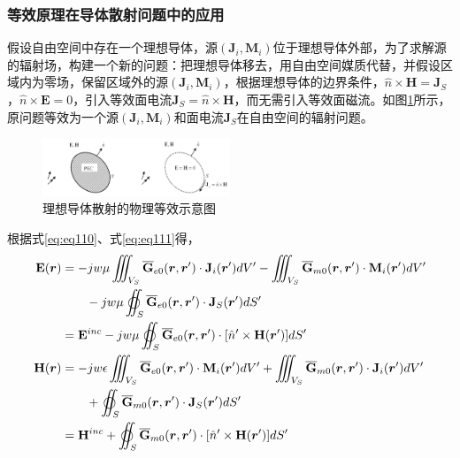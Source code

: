\documentclass{article}
\numberwithin{equation}{section}
\renewcommand{\vec}[1]{\boldsymbol{#1}}
\begin{document}
\subsubsection{等效原理在导体散射问题中的应用}
假设自由空间中存在一个理想导体，源$(\mathbf{J}_i,\mathbf{M}_i)$位于理想导体外部，为了求解源的辐射场，构建一个新的问题：把理想导体移去，用自由空间媒质代替，并假设区域内为零场，保留区域外的源$(\mathbf{J}_i,\mathbf{M}_i)$，根据理想导体的边界条件，$\hat{n}\times\mathbf{H}=\mathbf{J}_S$，$\hat{n}\times\mathbf{E}=0$，引入等效面电流$\mathbf{J}_S=\hat{n}\times\mathbf{H}$，而无需引入等效面磁流。如图\ref{fig:fig17}所示，原问题等效为一个源$(\mathbf{J}_i,\mathbf{M}_i)$和面电流$\mathbf{J}_S$在自由空间的辐射问题。
\begin{figure}[ht]
    \centering
    \includegraphics[width=0.5\textwidth]{理想导体散射的物理等效示意图.PNG}
    \caption{理想导体散射的物理等效示意图}
    \label{fig:fig17}
\end{figure}
\par
根据式\ref{eq:eq110}、式\ref{eq:eq111}得，
\begin{align}
    \label{eq:eq220}
    \mathbf{E}(\vec{r})&=-jw\mu\iiint_{V_S}\overline{\mathbf{G}}_{e0}(\vec{r},\vec{r}')\cdot \mathbf{J}_i(\vec{r}')dV'-\iiint_{V_S}\overline{\mathbf{G}}_{m0}(\vec{r},\vec{r}')\cdot \mathbf{M}_i(\vec{r}')dV' \nonumber \\
                       &\qquad-jw\mu\varoiint_S\overline{\mathbf{G}}_{e0}(\vec{r},\vec{r}')\cdot \mathbf{J}_S(\vec{r}')dS' \nonumber \\
                       &=\mathbf{E}^{inc}-jw\mu\varoiint_S\overline{\mathbf{G}}_{e0}(\vec{r},\vec{r}')\cdot [\hat{n}'\times\mathbf{H}(\vec{r}')]dS' \\
    \label{eq:eq221}
    \mathbf{H}(\vec{r})&=-jw\epsilon\iiint_{V_S}\overline{\mathbf{G}}_{e0}(\vec{r},\vec{r}')\cdot \mathbf{M}_i(\vec{r}')dV'+\iiint_{V_S}\overline{\mathbf{G}}_{m0}(\vec{r},\vec{r}')\cdot \mathbf{J}_i(\vec{r}')dV' \nonumber \\
                       &\qquad+\varoiint_S\overline{\mathbf{G}}_{m0}(\vec{r},\vec{r}')\cdot \mathbf{J}_S(\vec{r}')dS' \nonumber \\
                       &=\mathbf{H}^{inc}+\varoiint_S\overline{\mathbf{G}}_{m0}(\vec{r},\vec{r}')\cdot [\hat{n}'\times\mathbf{H}(\vec{r}')]dS'
\end{align}
\end{document}
